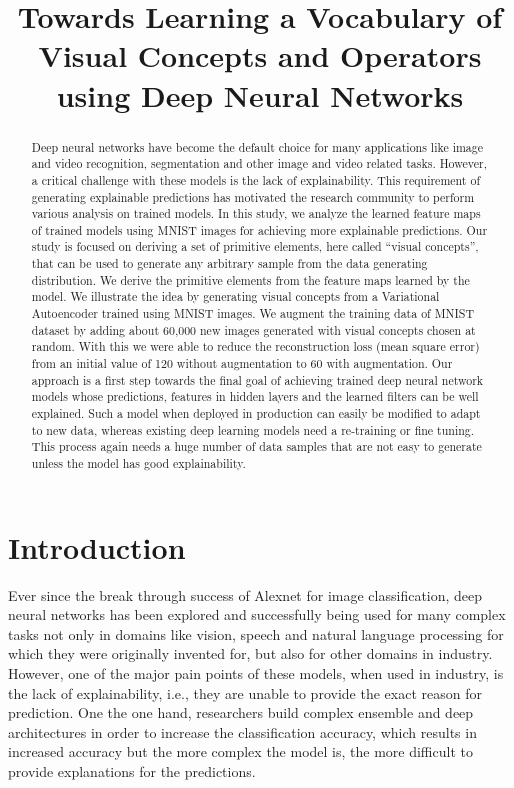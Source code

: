 \documentclass{bmvc2k}
\title{Towards Learning a Vocabulary of Visual Concepts and Operators using Deep Neural Networks}
\begin{document}
\maketitle

\begin{abstract}
    Deep neural networks have become the default choice for many applications like image and video recognition, segmentation and other image and video related tasks.
    However, a critical  challenge with these models is the lack of explainability.
    This requirement of generating explainable predictions has motivated the research community to perform various analysis on trained models.
    In this study, we analyze the learned feature maps of trained models using MNIST images for achieving more explainable predictions.
    Our study is focused on deriving a set of primitive elements, here called “visual concepts”, that can be used to generate any arbitrary sample from the data generating distribution.
    We derive the primitive elements from the feature maps learned by the model.
    We illustrate the idea by generating visual concepts from a Variational Autoencoder  trained using MNIST images.
    We augment the training data of MNIST dataset by adding about 60,000 new images generated with visual concepts chosen at random.
    With this we were able to reduce the reconstruction loss (mean square error) from an initial value of 120 without augmentation to 60 with augmentation.
    Our approach is a first step towards the final goal of achieving trained deep neural network models whose predictions, features in hidden layers and the learned filters can be well explained.
    Such a model when deployed in production can easily be modified to  adapt to new data, whereas existing deep learning models need a re-training or fine tuning.
    This process again needs a huge number of data samples that are not easy to generate unless the model has good explainability.
\end{abstract}

\section{Introduction}
Ever since the break through success of Alexnet \cite{krizhevsky2012imagenet} for image classification, deep neural networks has been explored and successfully being used for many complex tasks not only in domains like  vision, speech and natural language processing for which they were originally invented for, but also for other domains in industry.
However, one of the major pain points of these models, when used in industry, is the lack of explainability, i.e., they are unable to provide the exact reason for prediction.
One the one hand, researchers build complex ensemble and deep architectures in order to increase the classification accuracy, which results in increased accuracy but the more complex the model is, the more difficult to provide explanations for the predictions.
\end{document}
